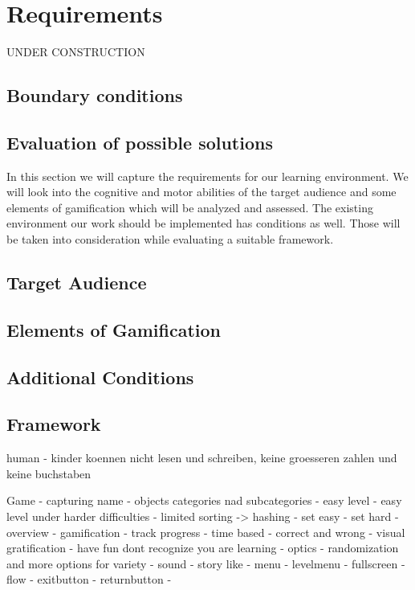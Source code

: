 
\chapter{Requirements}
\label{chap:requirements}
UNDER CONSTRUCTION

\section{Boundary conditions}

\section{Evaluation of possible solutions}

In this section we will capture the requirements for our learning environment.
We will look into the cognitive and motor abilities of the target audience and
some elements of gamification which will be analyzed and assessed.
The existing environment our work should be implemented has conditions as well.
Those will be taken into consideration while evaluating a suitable framework.

\section*{Target Audience}
\section*{Elements of Gamification}
\section*{Additional Conditions}
\section*{Framework}

human
- kinder koennen nicht lesen und schreiben, keine groesseren zahlen und keine buchstaben

Game
- capturing name
- objects categories nad subcategories
- easy level
- easy level under harder difficulties
- limited sorting -> hashing
- set easy
- set hard
- overview
- gamification
    - track progress
        - time based
        - correct and wrong
        - visual gratification
    - have fun dont recognize you are learning
        - optics
            - randomization and more options for variety
        - sound
        - story like
    - menu
    - levelmenu
    - fullscreen
    - flow
        - exitbutton
        - returnbutton
    -


